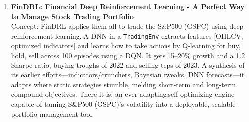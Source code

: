 \begin{enumerate}
    \item \textbf{FinDRL: Financial Deep Reinforcement Learning - A Perfect Way to Manage Stock Trading Portfolio} \\
    Concept: FinDRL applies them all to trade the S\&P500 (GSPC) using deep reinforcement learning. A DNN in a \texttt{TradingEnv} extracts features [OHLCV, optimized indicators] and learns how to take actions by Q-learning for buy, hold, sell across 100 episodes using a DQN. It gets 15–20\% growth and a 1.2 Sharpe ratio, buying troughs of 2022 and selling tops of 2023. A synthesis of its earlier efforts—indicators/crunchers, Bayesian tweaks, DNN forecasts—it adapts where static strategies stumble, melding short-term and long-term compound objectives. There it is: an ever-adapting,self-optimizing engine capable of taming S\&P500 (GSPC)'s volatility into a deployable, scalable portfolio management tool.
    
\end{enumerate}
